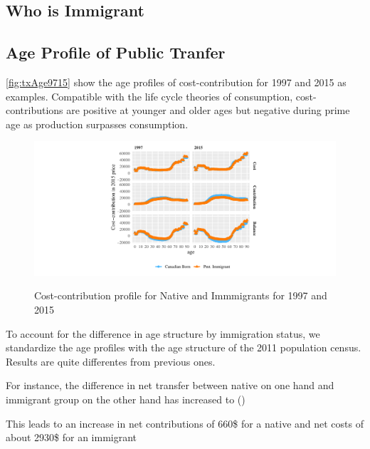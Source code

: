 \subsection{Who is Immigrant}\label{sec:immig}

\subsection{Age Profile of Public Tranfer}\label{sec:profile}

\autoref{fig:txAge9715} show the age profiles of cost-contribution for 1997 and 2015 as examples. Compatible with the life cycle theories of consumption, cost-contributions are positive at younger and older ages but negative during prime age as production surpasses consumption.

\begin{figure}[H]%
  \caption{ Cost-contribution profile for Native and Immmigrants for 1997 and 2015}
  \includegraphics[width=1\textwidth]{./res/txAge9715.pdf}%
  \label{fig:txAge9715}%
\end{figure}%




To account for the difference in age structure by immigration status, we standardize the age profiles with the age structure of the 2011 population census. Results are quite differentes from previous ones.

For instance, the difference in net transfer between native on one hand and  immigrant group on the other hand has increased to ()



This leads to an increase in net contributions of 660\$ for a native and net costs of about 2930\$ for an immigrant

